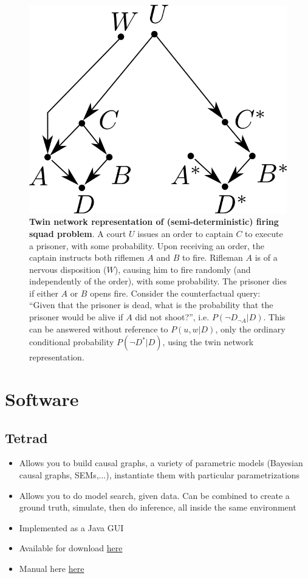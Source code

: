 \documentclass[11pt]{article}
\numberwithin{equation}{section}
\begin{document}
\begin{figure}
\begin{center}
\includegraphics[width=0.4\columnwidth]{figures/twin-network.png}  
\end{center}
\caption{\textbf{Twin network representation of (semi-deterministic) firing squad problem}. A court $U$ issues an order to captain $C$ to execute a prisoner, with some probability. Upon receiving an order, the captain instructs both riflemen $A$ and $B$ to fire. Rifleman $A$ is of a nervous disposition ($W$), causing him to fire randomly (and independently of the order), with some probability. The prisoner dies if either $A$ or $B$ opens fire. Consider the counterfactual query: ``Given that the prisoner is dead, what is the probability that the prisoner would be alive if $A$ did not shoot?'', i.e. $P(\neg D_{\neg A}| D)$. This can be answered without reference to $P(u,w|D)$, only the ordinary conditional probability $P(\neg D^*|D)$, using the twin network representation. }
\label{Fig:twin-network}
\end{figure}

\section{Software}

\subsection{Tetrad}
\begin{itemize}[noitemsep]
\item Allows you to build causal graphs, a variety of parametric models (Bayesian causal graphs, SEMs,...), instantiate them with particular parametrizations
\item Allows you to do model search, given data. Can be combined to create a ground truth, simulate, then do inference, all inside the same environment
\item Implemented as a Java GUI
\item Available for download \href{https://www.ccd.pitt.edu/tools/}{here} 
\item Manual here \href{http://cmu-phil.github.io/tetrad/manual/}{here}
\end{itemize}
\end{document}
